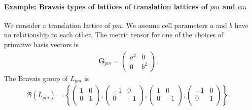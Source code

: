\paragraph{Example: Bravais types of lattices of translation lattices of $pm$ and $cm$}

We consider a translation lattice of $pm$.
We assume cell parameters $a$ and $b$ have no relationship to each other.
The metric tensor for one of the choices of primitive basis vectors is
\begin{align*}
  \bm{G}_{pm} = \begin{pmatrix} a^{2} & 0 \\ 0 & b^{2} \end{pmatrix}.
\end{align*}
The Bravais group of $L_{pm}$ is
\begin{align}
  \label{eq:bravais_group_pm_general}
  \mathcal{B}(L_{pm}) = \left\{
    \begin{pmatrix} 1 & 0 \\ 0 & 1 \\ \end{pmatrix},
    \begin{pmatrix} -1 & 0 \\ 0 & -1 \\ \end{pmatrix},
    \begin{pmatrix} 1 & 0 \\ 0 & -1 \\ \end{pmatrix},
    \begin{pmatrix} -1 & 0 \\ 0 & 1 \\ \end{pmatrix}
  \right\}.
\end{align}

